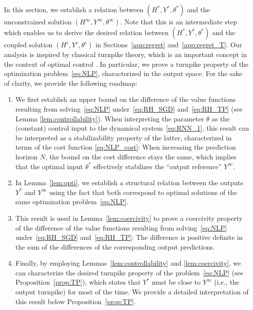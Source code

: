 \documentclass{article} %
\begin{document}
In this section, we establish a relation between $(H^*,Y^*,\theta^*)$ and the unconstrained solution $(H^\infty,Y^\infty,\theta^\infty)$.
Note that this is an intermediate step which enables us to derive the desired relation between $(H^*,Y^*,\theta^*)$ and the coupled solution $(H^\mathrm{c},Y^\mathrm{c},\theta^\mathrm{c})$ in Sections~\ref{app:regret} and~\ref{app:regret_T}.
Our analysis is inspired by classical turnpike theory, which is an important concept in the context of optimal control \citep{Trelat2025,Faulwasser2022,Zaslavski2006,Carlson1991}.
In particular, we prove a turnpike property of the optimization problem~\eqref{eq:NLP}, characterized in the output space. For the sake of clarity, we provide the following roadmap:
\begin{enumerate}
	\item We first establish an upper bound on the difference of the value functions resulting from solving~\eqref{eq:NLP} under~\eqref{eq:RH_SGD} and~\eqref{eq:RH_TP} (see Lemma \ref{lem:controllability}). When interpreting the parameter $\theta$ as the (constant) control input to the dynamical system~\eqref{eq:RNN_1}, this result can be interpreted as a stabilizability property of the latter, characterized in terms of the cost function \eqref{eq:NLP_cost}: When increasing the prediction horizon $N$, the bound on the cost difference stays the same, which implies that the optimal input $\theta^*$ effectively stabilizes the ``output reference'' $Y^\infty$.
	
	\item In Lemma~\ref{lem:opti}, we establish a structural relation between the outputs $Y^*$ and $Y^\infty$ using the fact that both correspond to optimal solutions of the same optimization problem~\eqref{eq:NLP}.
	
	\item This result is used in Lemma~\ref{lem:coercivity} to prove a coercivity property of the difference of the value functions resulting from solving~\eqref{eq:NLP} under~\eqref{eq:RH_SGD} and~\eqref{eq:RH_TP}: The difference is positive definite in the sum of the differences of the corresponding output predictions.
	
	\item Finally, by employing Lemmas~\ref{lem:controllability} and \ref{lem:coercivity}, we can characterize the desired turnpike property of the problem~\eqref{eq:NLP} (see Proposition~\ref{prop:TP}), which states that $Y^*$ must be close to $Y^\infty$ (i.e., the output turnpike) for most of the time. We provide a detailed interpretation of this result below Proposition~\ref{prop:TP}.
\end{enumerate}
\end{document}
